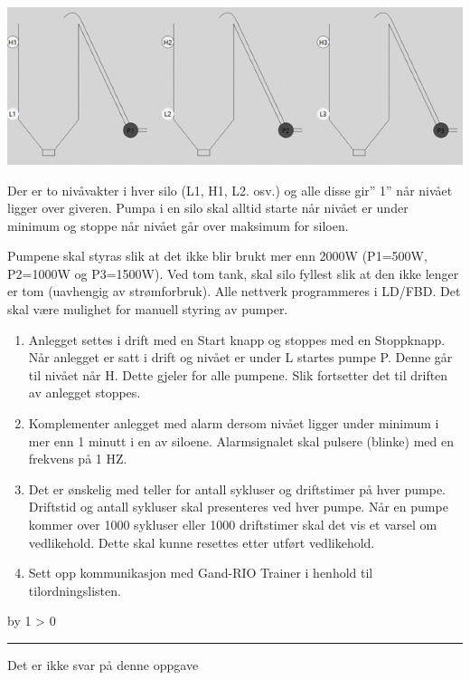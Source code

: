 \documentclass[12pt,a4paper]{article}
\def\svar{
           \advance\answnum by 1
           \ifnum \answnum > 0
                \hrule
                \vskip 3pt
                \leftline{Svar \the\answnum}
                \vskip 3pt \fi}
\begin{document}
\includegraphics[width=1\textwidth]{i08012x02.png}

Der er to nivåvakter i hver silo (L1, H1, L2. osv.) og alle disse
gir\textquotedblright{} 1\textquotedblright{} når nivået ligger over
giveren. Pumpa i en silo skal alltid starte når nivået er under minimum
og stoppe når nivået går over maksimum for siloen.

Pumpene skal styras slik at det ikke blir brukt mer enn 2000W (P1=500W,
P2=1000W og P3=1500W). Ved tom tank, skal silo fyllest slik at den
ikke lenger er tom (uavhengig av strømforbruk). Alle nettverk programmeres
i LD/FBD. Det skal være mulighet for manuell styring av pumper. 
\begin{enumerate}
\item Anlegget settes i drift med en Start knapp og stoppes med en Stoppknapp.
Når anlegget er satt i drift og nivået er under L startes pumpe P.
Denne går til nivået når H. Dette gjeler for alle pumpene. Slik fortsetter
det til driften av anlegget stoppes. 
\item Komplementer anlegget med alarm dersom nivået ligger under minimum
i mer enn 1 minutt i en av siloene. Alarmsignalet skal pulsere (blinke)
med en frekvens på 1 HZ. 
\item Det er ønskelig med teller for antall sykluser og driftstimer på hver
pumpe. Driftstid og antall sykluser skal presenteres ved hver pumpe.
Når en pumpe kommer over 1000 sykluser eller 1000 driftstimer skal
det vis et varsel om vedlikehold. Dette skal kunne resettes etter
utført vedlikehold. 
\item Sett opp kommunikasjon med Gand-RIO Trainer i henhold til tilordningslisten.
\end{enumerate}
\vskip 10pt
\vskip 10pt \filbreak 





\svar{} 
Det er ikke svar på denne oppgave
\vskip 10pt \filbreak 
\end{document}
